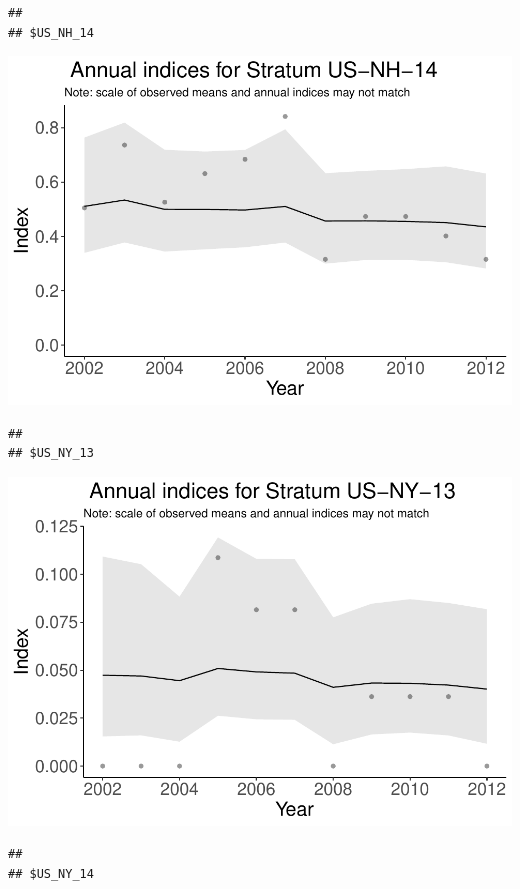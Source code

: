 \documentclass[]{article}
\begin{document}
\begin{verbatim}
## 
## $US_NH_14
\end{verbatim}

\includegraphics{index_files/figure-latex/unnamed-chunk-7-23.pdf}

\begin{verbatim}
## 
## $US_NY_13
\end{verbatim}

\includegraphics{index_files/figure-latex/unnamed-chunk-7-24.pdf}

\begin{verbatim}
## 
## $US_NY_14
\end{verbatim}
\end{document}
